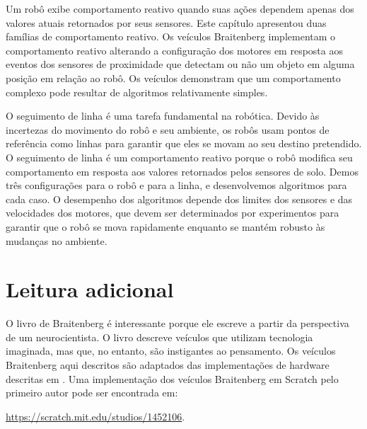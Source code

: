 Um robô exibe comportamento reativo quando suas ações dependem apenas dos valores atuais retornados por seus sensores. Este capítulo apresentou duas famílias de comportamento reativo. Os veículos Braitenberg implementam o comportamento reativo alterando a configuração dos motores em resposta aos eventos dos sensores de proximidade que detectam ou não um objeto em alguma posição em relação ao robô. Os veículos demonstram que um comportamento complexo pode resultar de algoritmos relativamente simples.

O seguimento de linha é uma tarefa fundamental na robótica. Devido às incertezas do movimento do robô e seu ambiente, os robôs usam pontos de referência como linhas para garantir que eles se movam ao seu destino pretendido. O seguimento de linha é um comportamento reativo porque o robô modifica seu comportamento em resposta aos valores retornados pelos sensores de solo. Demos três configurações para o robô e para a linha, e desenvolvemos algoritmos para cada caso. O desempenho dos algoritmos depende dos limites dos sensores e das velocidades dos motores, que devem ser determinados por experimentos para garantir que o robô se mova rapidamente enquanto se mantém robusto às mudanças no ambiente.

\section{Leitura adicional}

O livro de Braitenberg \cite{valentino} é interessante porque ele escreve a partir da perspectiva de um neurocientista. O livro descreve veículos que utilizam tecnologia imaginada, mas que, no entanto, são instigantes ao pensamento. Os veículos Braitenberg aqui descritos são adaptados das implementações de hardware descritas em \cite{creatures}. Uma implementação dos veículos Braitenberg em Scratch pelo primeiro autor pode ser encontrada em:\par\noindent\url{https://scratch.mit.edu/studios/1452106}.

